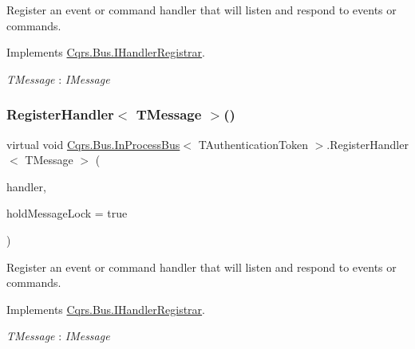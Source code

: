 Register an event or command handler that will listen and respond to events or commands. 



Implements \hyperlink{interfaceCqrs_1_1Bus_1_1IHandlerRegistrar_ab6ca4dfdc54a5aeebe4651dbdb479f55}{Cqrs.\+Bus.\+I\+Handler\+Registrar}.

\begin{Desc}
\item[Type Constraints]\begin{description}
\item[{\em T\+Message} : {\em I\+Message}]\end{description}
\end{Desc}
\mbox{\label{classCqrs_1_1Bus_1_1InProcessBus_a62171e3c6d155cfdfd921b07b4909adf}} 
\subsubsection{\texorpdfstring{Register\+Handler$<$ T\+Message $>$()}{RegisterHandler< TMessage >()}\hspace{0.1cm}{\footnotesize\ttfamily [2/2]}}
{\footnotesize\ttfamily virtual void \hyperlink{classCqrs_1_1Bus_1_1InProcessBus}{Cqrs.\+Bus.\+In\+Process\+Bus}$<$ T\+Authentication\+Token $>$.Register\+Handler$<$ T\+Message $>$ (\begin{DoxyParamCaption}\item[{Action$<$ T\+Message $>$}]{handler,  }\item[{bool}]{hold\+Message\+Lock = {\ttfamily true} }\end{DoxyParamCaption})\hspace{0.3cm}{\ttfamily [virtual]}}



Register an event or command handler that will listen and respond to events or commands. 



Implements \hyperlink{interfaceCqrs_1_1Bus_1_1IHandlerRegistrar_a07792dcc9a8b272709ff2e2dd336a642}{Cqrs.\+Bus.\+I\+Handler\+Registrar}.

\begin{Desc}
\item[Type Constraints]\begin{description}
\item[{\em T\+Message} : {\em I\+Message}]\end{description}
\end{Desc}
\mbox{\label{classCqrs_1_1Bus_1_1InProcessBus_a6a074ef3663d2855875307b106fe4416}} 
